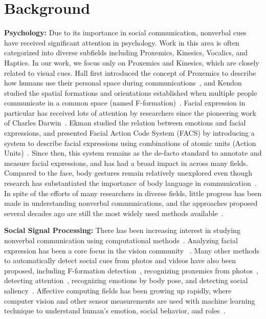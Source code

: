 \section{Background}

\textbf{Psychology:}
Due to its importance in social communication, nonverbal cues have received significant attention in psychology. Work in this area is often categorized into diverse subfields including Proxemics, Kinesics, Vocalics, and Haptics. In our work, we focus only on Proxemics and Kinesics, which are closely related to visual cues. Hall first introduced the concept of Proxemics to describe how humans use their personal space during communications~\cite{Hall66}, and Kendon studied the spatial formations and orientations established when multiple people communicate in a common space (named F-formation)~\cite{kendon90}. Facial expression in particular has received lots of attention by researchers since the pioneering work of Charles Darwin~\cite{Darwin-1872}. Ekman studied the relation between emotions and facial expressions, and presented Facial Action Code System (FACS) by introducing a system to describe facial expressions using combinations of atomic units (Action Units)~\cite{ekman1977facial}. Since then, this system remains as the de-facto standard to annotate and measure facial expressions, and has had a broad impact in across many fields. Compared to the face, body gestures remain relatively unexplored even though research has substantiated the importance of body language in communication~\cite{Gelder09, Moore13, Meeren-2005, Aviezer-2012}. In spite of the efforts of many researchers in diverse fields, little progress has been made in understanding nonverbal communications, and the approaches proposed several decades ago are still the most widely used methods available~\cite{Moore13}. 

\textbf{Social Signal Processing:}
There has been increasing interest in studying nonverbal communication using computational methods~\cite{vinciarelli2009social}. Analyzing facial expression has been a core focus in the vision community ~\cite{ChuDC13, Torre15, shan2009facial}. Many other methods to automatically detect social cues from photos and videos have also been proposed, including F-formation detection~\cite{setti2015f}, recognizing proxemics from photos~\cite{yang2012recognizing}, detecting attention~\cite{Fathi-2012}, recognizing emotions by body pose\cite{schindler2008recognizing}, and detecting social saliency~\cite{park20123d}. Affective computing fields has been growing up rapidly, where computer vision and other sensor measurements are used with machine learning technique to understand human's emotion, social behavior, and roles~\cite{picard1997affective}. 

